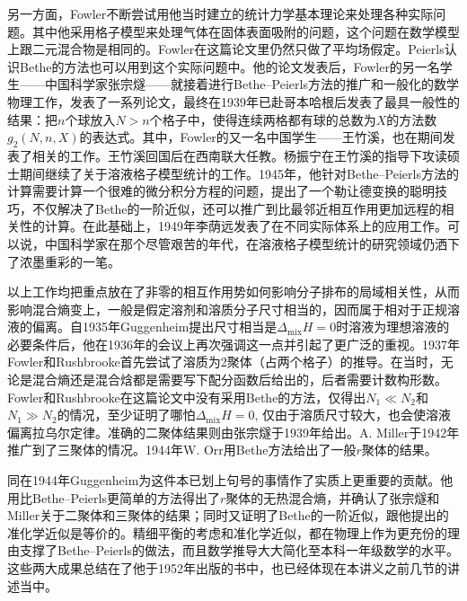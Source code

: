 \documentclass[main.tex]{subfiles}
\begin{document}
另一方面，Fowler不断尝试用他当时建立的统计力学基本理论来处理各种实际问题。其中他采用格子模型来处理气体在固体表面吸附的问题\cite{Fowler1936}，这个问题在数学模型上跟二元混合物是相同的。Fowler在这篇论文里仍然只做了平均场假定。Peierls认识Bethe的方法也可以用到这个实际问题中\cite{Peierls1936a}。他的论文发表后，Fowler的另一名学生——中国科学家张宗燧——就接着进行Bethe--Peierls方法的推广和一般化的数学物理工作，发表了一系列论文\cite{Chang1938,Chang1939}，最终在1939年已赴哥本哈根后发表了最具一般性的结果：把$n$个球放入$N>n$个格子中，使得连续两格都有球的总数为$X$的方法数$g_2\left(N,n,X\right)$的表达式\cite{Chang1939b}。其中，Fowler的又一名中国学生——王竹溪，也在期间发表了相关的工作\cite{Wang1937}。王竹溪回国后在西南联大任教。杨振宁在王竹溪的指导下攻读硕士期间继续了关于溶液格子模型统计的工作\cite{Yang1983}。1945年，他针对Bethe--Peierls方法的计算需要计算一个很难的微分积分方程的问题，提出了一个勒让德变换的聪明技巧，不仅解决了Bethe的一阶近似，还可以推广到比最邻近相互作用更加远程的相关性的计算\cite{Yang1945}。在此基础上，1949年李荫远发表了在不同实际体系上的应用工作\cite{Li1949}。可以说，中国科学家在那个尽管艰苦的年代，在溶液格子模型统计的研究领域仍洒下了浓墨重彩的一笔。

以上工作均把重点放在了非零的相互作用势如何影响分子排布的局域相关性，从而影响混合熵变上，一般是假定溶剂和溶质分子尺寸相当的，因而属于相对于正规溶液的偏离。自1935年Guggenheim提出尺寸相当是$\Delta_\text{mix}H=0$时溶液为理想溶液的必要条件后，他在1936年的会议上再次强调这一点\cite{Guggenheim1937}并引起了更广泛的重视。1937年Fowler和Rushbrooke首先尝试了溶质为2聚体（占两个格子）的推导\cite{Fowler1937}。在当时，无论是混合熵还是混合焓都是需要写下配分函数后给出的，后者需要计数构形数。Fowler和Rushbrooke在这篇论文中没有采用Bethe的方法，仅得出$N_1\ll N_2$和$N_1\gg N_2$的情况，至少证明了哪怕$\Delta_\text{mix}H=0$, 仅由于溶质尺寸较大，也会使溶液偏离拉乌尔定律。准确的二聚体结果则由张宗燧于1939年给出\cite{Chang1939a}。A. Miller于1942年推广到了三聚体的情况\cite{Miller1942,Miller1943}。1944年W. Orr用Bethe方法给出了一般$r$聚体的结果\cite{Orr1944}。

同在1944年Guggenheim为这件本已划上句号的事情作了实质上更重要的贡献。他用比Bethe--Peierls更简单的方法得出了$r$聚体的无热混合熵，并确认了张宗燧和Miller关于二聚体和三聚体的结果\cite{Guggenheim1944}；同时又证明了Bethe的一阶近似，跟他提出的准化学近似是等价的\cite{Guggenheim1944a}。精细平衡的考虑和准化学近似，都在物理上作为更充份的理由支撑了Bethe--Peierls的做法，而且数学推导大大简化至本科一年级数学的水平。这些两大成果总结在了他于1952年出版的书中\cite{Guggenheim1952}，也已经体现在本讲义之前几节的讲述当中。
\end{document}
